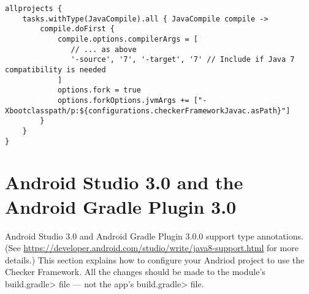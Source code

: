 \begin{enumerate}
\begin{mysmall}
\begin{Verbatim}
allprojects {
    tasks.withType(JavaCompile).all { JavaCompile compile ->
        compile.doFirst {
            compile.options.compilerArgs = [
               // ... as above
               '-source', '7', '-target', '7' // Include if Java 7 compatibility is needed
            ]
            options.fork = true
            options.forkOptions.jvmArgs += ["-Xbootclasspath/p:${configurations.checkerFrameworkJavac.asPath}"]
        }
    }
}
\end{Verbatim}
\end{mysmall}


\end{enumerate}

\section{Android Studio 3.0 and the Android Gradle Plugin 3.0\label{android-gradle}}

Android Studio 3.0 and Android Gradle Plugin 3.0.0 support type
annotations.  (See
\url{https://developer.android.com/studio/write/java8-support.html}
for more details.)  This section explains how to configure your Andriod
project to use the Checker Framework.  All the changes should be made to
the module's \<build.gradle> file --- not the app's \<build.gradle> file.

